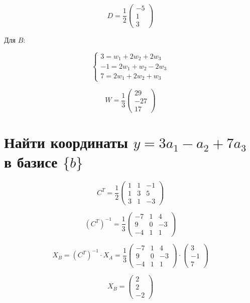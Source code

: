 \documentclass{article}
\begin{document}
        \[
        D = \frac{1}{2} \begin{pmatrix} -5 \\ 1 \\ 3 \end{pmatrix}
        \]
        
        Для \( B \):
        
        \[
        \begin{cases}
        3 = w_1 + 2w_2 + 2w_3 \\
        -1 = 2w_1 + w_2 - 2w_3 \\
        7 = 2w_1 + 2w_2 + w_3
        \end{cases}
        \]
        
        \[
        W = \frac{1}{3} \begin{pmatrix} 29 \\ -27 \\ 17 \end{pmatrix}
        \]
        
        \section{Найти координаты $y = 3a_1 - a_2 + 7a_3$ в базисе $\{b\}$} 
        \vspace{0.5cm}
        
        \[
        C^T = \frac{1}{2} \begin{pmatrix} 
        1 & 1 & -1 \\
        1 & 3 & 5 \\
        3 & 1 & -3 
        \end{pmatrix}
        \]
        
        \[
        (C^{T})^{-1} = \frac{1}{3} \begin{pmatrix} 
        -7 & 1 & 4 \\
        9 & 0 & -3 \\
        -4 & 1 & 1 
        \end{pmatrix}
        \]
        
        \[
        X_B = (C^T)^{-1} \cdot X_A = \frac{1}{3} \begin{pmatrix} 
        -7 & 1 & 4 \\
        9 & 0 & -3 \\
        -4 & 1 & 1 
        \end{pmatrix} \cdot \begin{pmatrix} 
        3 \\ -1 \\ 7 
        \end{pmatrix}
        \]
        
        \[
        X_B = \begin{pmatrix} 2 \\ 2 \\ -2 \end{pmatrix}
        \]
        
\end{document}
